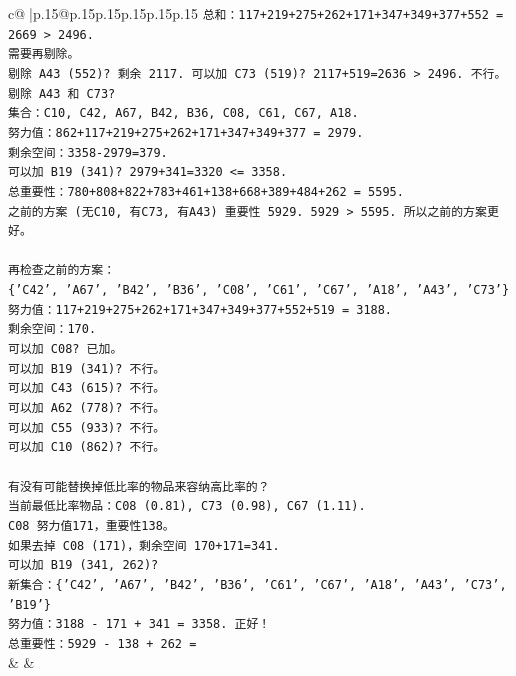 \documentclass{article}
\begin{document}
{\begin{supertabular}{c@{$\;$}|p{.15\linewidth}@{}p{.15\linewidth}p{.15\linewidth}p{.15\linewidth}p{.15\linewidth}p{.15\linewidth}}
{{{\texttt{总和：117+219+275+262+171+347+349+377+552 = 2669 > 2496.} \\
\texttt{需要再剔除。} \\
\texttt{剔除 A43 (552)? 剩余 2117. 可以加 C73 (519)? 2117+519=2636 > 2496. 不行。} \\
\texttt{剔除 A43 和 C73?} \\
\texttt{集合：C10, C42, A67, B42, B36, C08, C61, C67, A18.} \\
\texttt{努力值：862+117+219+275+262+171+347+349+377 = 2979.} \\
\texttt{剩余空间：3358{-}2979=379.} \\
\texttt{可以加 B19 (341)? 2979+341=3320 <= 3358.} \\
\texttt{总重要性：780+808+822+783+461+138+668+389+484+262 = 5595.} \\
\texttt{之前的方案 (无C10, 有C73, 有A43) 重要性 5929. 5929 > 5595. 所以之前的方案更好。} \\
\\ 
\texttt{再检查之前的方案：} \\
\texttt{\{'C42', 'A67', 'B42', 'B36', 'C08', 'C61', 'C67', 'A18', 'A43', 'C73'\}} \\
\texttt{努力值：117+219+275+262+171+347+349+377+552+519 = 3188.} \\
\texttt{剩余空间：170.} \\
\texttt{可以加 C08? 已加。} \\
\texttt{可以加 B19 (341)? 不行。} \\
\texttt{可以加 C43 (615)? 不行。} \\
\texttt{可以加 A62 (778)? 不行。} \\
\texttt{可以加 C55 (933)? 不行。} \\
\texttt{可以加 C10 (862)? 不行。} \\
\\ 
\texttt{有没有可能替换掉低比率的物品来容纳高比率的？} \\
\texttt{当前最低比率物品：C08 (0.81), C73 (0.98), C67 (1.11).} \\
\texttt{C08 努力值171，重要性138。} \\
\texttt{如果去掉 C08 (171)，剩余空间 170+171=341.} \\
\texttt{可以加 B19 (341, 262)?} \\
\texttt{新集合：\{'C42', 'A67', 'B42', 'B36', 'C61', 'C67', 'A18', 'A43', 'C73', 'B19'\}} \\
\texttt{努力值：3188 {-} 171 + 341 = 3358. 正好！} \\
\texttt{总重要性：5929 {-} 138 + 262 =} \\
            }
        }
    }
    & & \\ \\


\end{supertabular}}
\end{document}
